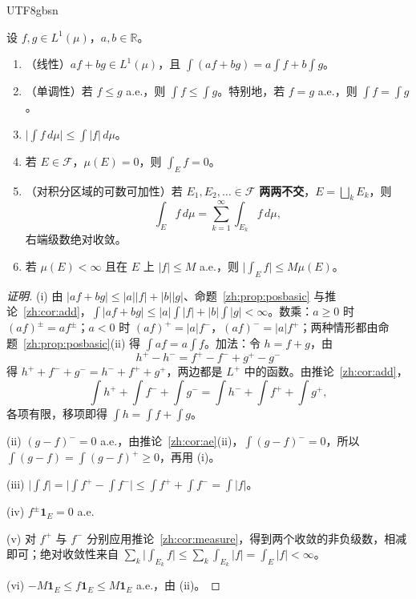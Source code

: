 \documentclass[11pt]{article}
\makeatletter
\newcommand{\envlabel}[1]{\protected@edef\@currentlabel{\themathenv}\label{#1}}
\makeatother
\begin{document}
\begin{CJK*}{UTF8}{gbsn}
\begin{theorem}\envlabel{zh:thm:basic}
设 $f,g\in L^{1}(\mu)$，$a,b\in\mathbb{R}$。
\begin{enumerate}
  \item（线性）$af+bg\in L^{1}(\mu)$，且 $\int(af+bg)=a\int f+b\int g$。
  \item（单调性）若 $f\leq g$ a.e.，则 $\int f\leq\int g$。特别地，若 $f=g$ a.e.，则 $\int f=\int g$。
  \item $\big|\int f\,d\mu\big|\leq\int|f|\,d\mu$。
  \item 若 $E\in\mathcal{F}$，$\mu(E)=0$，则 $\int_{E}f=0$。
  \item（对积分区域的可数可加性）若 $E_{1},E_{2},\ldots\in\mathcal{F}$ \textbf{两两不交}，$E=\bigsqcup_{k}E_{k}$，则
  \[
  \int_{E}f\,d\mu=\sum_{k=1}^{\infty}\int_{E_{k}}f\,d\mu,
  \]
  右端级数绝对收敛。
  \item 若 $\mu(E)<\infty$ 且在 $E$ 上 $|f|\leq M$ a.e.，则 $\big|\int_{E}f\big|\leq M\mu(E)$。
\end{enumerate}
\end{theorem}

\begin{proof}[证明]
(i) 由 $|af+bg|\leq|a||f|+|b||g|$、命题~\ref{zh:prop:posbasic} 与推论~\ref{zh:cor:add}，$\int|af+bg|\leq|a|\int|f|+|b|\int|g|<\infty$。数乘：$a\geq0$ 时 $(af)^{\pm}=af^{\pm}$；$a<0$ 时 $(af)^{+}=|a|f^{-}$，$(af)^{-}=|a|f^{+}$；两种情形都由命题~\ref{zh:prop:posbasic}(ii) 得 $\int af=a\int f$。加法：令 $h=f+g$，由
\[
h^{+}-h^{-}=f^{+}-f^{-}+g^{+}-g^{-}
\]
得 $h^{+}+f^{-}+g^{-}=h^{-}+f^{+}+g^{+}$，两边都是 $L^{+}$ 中的函数。由推论~\ref{zh:cor:add}，
\[
\int h^{+}+\int f^{-}+\int g^{-}=\int h^{-}+\int f^{+}+\int g^{+},
\]
各项有限，移项即得 $\int h=\int f+\int g$。

(ii) $(g-f)^{-}=0$ a.e.，由推论~\ref{zh:cor:ae}(ii)，$\int(g-f)^{-}=0$，所以 $\int(g-f)=\int(g-f)^{+}\geq0$，再用 (i)。

(iii) $\big|\int f\big|=\big|\int f^{+}-\int f^{-}\big|\leq\int f^{+}+\int f^{-}=\int|f|$。

(iv) $f^{\pm}\mathbf{1}_{E}=0$ a.e.

(v) 对 $f^{+}$ 与 $f^{-}$ 分别应用推论~\ref{zh:cor:measure}，得到两个收敛的非负级数，相减即可；绝对收敛性来自 $\sum_{k}\big|\int_{E_{k}}f\big|\leq\sum_{k}\int_{E_{k}}|f|=\int_{E}|f|<\infty$。

(vi) $-M\mathbf{1}_{E}\leq f\mathbf{1}_{E}\leq M\mathbf{1}_{E}$ a.e.，由 (ii)。
\end{proof}


\end{CJK*}
\end{document}
